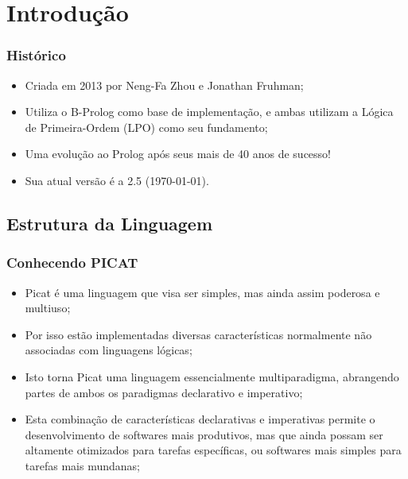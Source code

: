 \section{Introdução}
\begin{frame}

    \frametitle{Histórico}

    \begin{itemize}
      \item Criada em 2013 por Neng-Fa Zhou e Jonathan Fruhman; 

      \item Utiliza o B-Prolog como base de implementação, e ambas utilizam 
      a Lógica de Primeira-Ordem (LPO) como seu fundamento;

      \item Uma evolução ao Prolog após seus mais de 40 anos de sucesso!

      \item Sua atual versão é a 2.5 (\today).

    \end{itemize}
\end{frame}


\subsection{Estrutura da Linguagem}

\begin{frame}
	\frametitle{Conhecendo PICAT}
    
    \begin{itemize}
    
    	\item Picat é uma linguagem que visa ser simples, mas ainda assim
        poderosa e multiuso;
        
        \item Por isso estão implementadas diversas características 
        normalmente não associadas com linguagens lógicas;
        
        \item Isto torna Picat uma linguagem essencialmente multiparadigma,
        abrangendo partes de ambos os paradigmas declarativo e imperativo;
        
        \item Esta combinação de características declarativas e imperativas permite
        o desenvolvimento de softwares mais produtivos, mas que ainda possam ser altamente 
        otimizados para tarefas específicas, ou softwares mais simples para tarefas mais mundanas;
        
    \end{itemize}
    
\end{frame}

